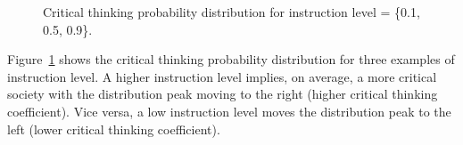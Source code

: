 \begin{figure}[!t]
	\centering
	\hfill
	\par 
	\caption{Critical thinking probability distribution for instruction level = \{0.1, 0.5, 0.9\}.}
	\label{pics:critdistribution}
\end{figure}

Figure~\ref{pics:critdistribution} shows the critical thinking probability distribution for three examples of instruction level. A higher instruction level implies, on average, a more critical society with the distribution peak moving to the right (higher critical thinking coefficient). Vice versa, a low instruction level moves the distribution peak to the left (lower critical thinking coefficient). \newline

